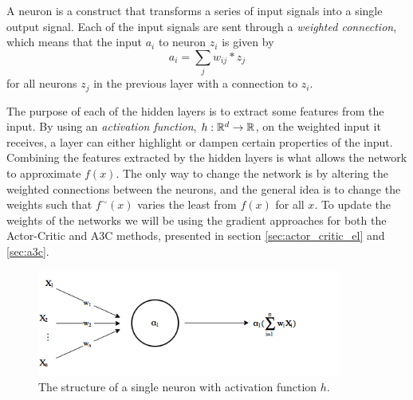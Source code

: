 \documentclass[11pt]{article}
\begin{document}
A neuron is a construct that transforms a series of input signals into a single output signal.
Each of the input signals are sent through a \textit{weighted connection}, which means
that the input $a_i$ to neuron $z_i$ is given by
\begin{equation}
    a_i = \sum\limits_{j} w_{ij}* z_j
\end{equation}
for all neurons $z_j$ in the previous layer with a connection to $z_i$.

The purpose of each of the hidden layers is to extract some features from the input.
By using an \textit{activation function}, $h : \mathbb{R}^d \to \mathbb{R}$, on the
weighted input it receives, a layer can either highlight or dampen
certain properties of the input.
Combining the features extracted by the hidden layers is what allows the network
to approximate $f(x)$.
The only way to change the network is by altering the weighted connections
between the neurons, and the general idea is to change the weights such that
$f^\sim(x)$ varies the least from $f(x)$ for all $x$.
To update the weights of the networks we will be using the gradient approaches
for both the Actor-Critic and A3C methods, presented in section \ref{sec:actor_critic_el} and \ref{sec:a3c}.
\begin{figure}[!h]
    \centering
    \includegraphics[width=10cm]{include/neuron.png}
    \caption{The structure of a single neuron with activation function $h$.}
    \label{fig:neuron}
\end{figure}
\end{document}
